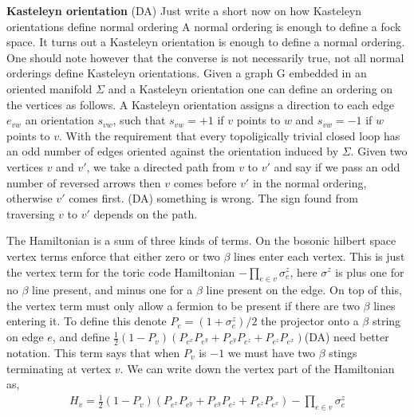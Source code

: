 \documentclass[12pt,a4paper]{article}
\newcommand{\dave}[1]{{\color{ao(english)}\footnotesize{(DA) #1}}}
\begin{document}
{\bf Kasteleyn orientation}
\dave{Just write a short now on how Kasteleyn orientations define normal ordering}
A normal ordering is enough to define a fock space. It turns out a Kasteleyn orientation is enough to define a normal ordering. One should note however that the converse is not necessarily true, not all normal orderings define Kasteleyn orientations. 
Given a graph {\cal G} embedded in an oriented manifold $\Sigma$ and a Kasteleyn orientation one can define an ordering on the vertices as follows. 
A Kasteleyn orientation assigns a direction to each edge $e_{vw}$ an orientation $s_{vw}$, such that $s_{vw} = +1$ if $v$ points to $w$ and $s_{vw}=-1$ if $w$ points to $v$. 
With the requirement that every topoligically trivial closed loop has an odd number of edges oriented against the orientation induced by $\Sigma$.
Given two vertices $v$ and $v'$, we take a directed path from $v$ to $v'$ and say if we pass an odd number of reversed arrows then $v$ comes before $v'$ in the normal ordering, otherwise $v'$ comes first. 
\dave{something is wrong. The sign found from traversing $v$ to $v'$ depends on the path.}

The Hamiltonian is a sum of three kinds of terms. 
On the bosonic hilbert space vertex terms enforce that either zero or two $\beta$ lines enter each vertex. This is just the vertex term for the toric code Hamiltonian $-\prod_{e \in v} \sigma_e^z$, here $\sigma^z$ is plus one for no $\beta$ line present, and minus one for a $\beta$ line present on the edge. 
On top of this, the vertex term must only allow a fermion to be present if there are two $\beta$ lines entering it.
To define this denote $P_e = (1+\sigma^z_e)/2$ the projector onto a $\beta$ string on edge $e$, and define $\frac{1}{2}(1-P_v)(P_{e^x}P_{e^y}+P_{e^y}P_{e^z}+P_{e^z}P_{e^x})$\dave{need better notation}. This term says that when $P_v$ is $-1$ we must have two $\beta$ stings terminating at vertex  $v$.
We can write down the vertex part of the Hamiltonian as,
\begin{align}
H_v = \frac{1}{2}(1-P_v)(P_{e^x}P_{e^y}+P_{e^y}P_{e^z}+P_{e^z}P_{e^x}) - \prod_{e \in v} \sigma_e^z
\end{align}
\end{document}
